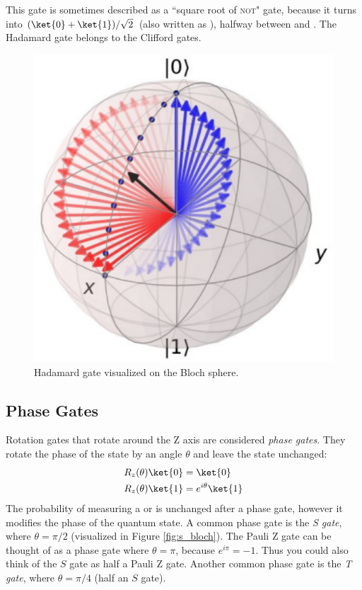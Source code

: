 \documentclass[11pt, notitlepage]{report}
\begin{document}
This gate is sometimes described as a ``square root of \textsc{not}" gate, because it turns  into $(\ket{0} + \ket{1})/\sqrt2$ (also written as \ket{+}), halfway between  and . The Hadamard gate belongs to the Clifford gates.

\begin{figure}[ht]
    \centering
    \includegraphics[scale=0.18]{images/hadamard_gate.eps}
    \vspace{2mm}
    \caption{Hadamard gate visualized on the Bloch sphere.}
\end{figure}

\subsection{Phase Gates}
Rotation gates that rotate around the Z axis are considered \emph{phase gates}. They rotate the phase of the  state by an angle $\theta$ and leave the  state unchanged:
\begin{align*}
R_z(\theta) \ket{0} &= \ket{0} \\
R_z(\theta) \ket{1} &= e^{i\theta}\ket{1}
\end{align*}
The probability of measuring a  or  is unchanged after a phase gate, however it modifies the phase of the quantum state. A common phase gate is the \emph{S gate}, where $\theta = \pi/2$ (visualized in Figure \ref{fig:s_bloch}). The Pauli Z gate can be thought of as a phase gate where $\theta = \pi$, because $e^{i\pi} = -1$. Thus you could also think of the $S$ gate as half a Pauli Z gate. Another common phase gate is the \emph{T gate}, where $\theta = \pi/4$ (half an $S$ gate).
\end{document}
